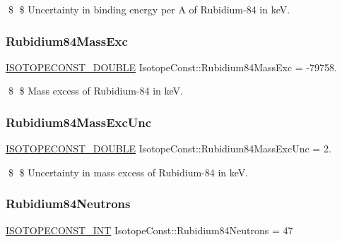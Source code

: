 \$ \$ Uncertainty in binding energy per A of Rubidium-\/84 in keV. \mbox{\label{group___isotope_const-_rubidium-_rb84_gabc8796a19ac597428c262272b539d942}} 
\subsubsection{\texorpdfstring{Rubidium84\+Mass\+Exc}{Rubidium84MassExc}}
{\footnotesize\ttfamily \mbox{\hyperlink{group___isotope_const-_macros_ga8f45a7272ce02c0b4c65c44636ed719a}{I\+S\+O\+T\+O\+P\+E\+C\+O\+N\+S\+T\+\_\+\+D\+O\+U\+B\+LE}} Isotope\+Const\+::\+Rubidium84\+Mass\+Exc = -\/79758.}

\$ \$ Mass excess of Rubidium-\/84 in keV. \mbox{\label{group___isotope_const-_rubidium-_rb84_ga1ea6e3fb6f6dc900ea06f367cb7e16fb}} 
\subsubsection{\texorpdfstring{Rubidium84\+Mass\+Exc\+Unc}{Rubidium84MassExcUnc}}
{\footnotesize\ttfamily \mbox{\hyperlink{group___isotope_const-_macros_ga8f45a7272ce02c0b4c65c44636ed719a}{I\+S\+O\+T\+O\+P\+E\+C\+O\+N\+S\+T\+\_\+\+D\+O\+U\+B\+LE}} Isotope\+Const\+::\+Rubidium84\+Mass\+Exc\+Unc = 2.}

\$ \$ Uncertainty in mass excess of Rubidium-\/84 in keV. \mbox{\label{group___isotope_const-_rubidium-_rb84_ga7f30fc732eaeb208e2059411f2f8aabb}} 
\subsubsection{\texorpdfstring{Rubidium84\+Neutrons}{Rubidium84Neutrons}}
{\footnotesize\ttfamily \mbox{\hyperlink{group___isotope_const-_macros_ga5f18360b3e99483a35c32d789e62621c}{I\+S\+O\+T\+O\+P\+E\+C\+O\+N\+S\+T\+\_\+\+I\+NT}} Isotope\+Const\+::\+Rubidium84\+Neutrons = 47}

